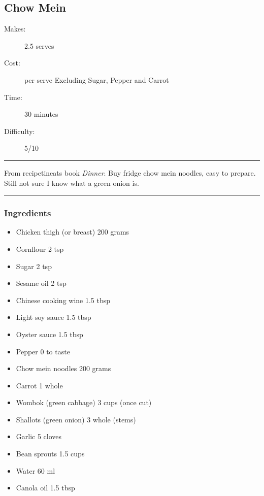 \documentclass[]{article}
\begin{document}
\subsection*{\center\huge Chow Mein}
\begin{description}
\item[Makes:] 2.5 serves
\item[Cost:]  per serve Excluding Sugar, Pepper and Carrot
\item[Time:] 30 minutes
\item[Difficulty:] 5/10
\end{description}
\vspace{0.2cm}\hrule\vspace{0.5cm}
\begin{adjustwidth}{0.5 cm}{0.5 cm}

From recipetineats book \textit{Dinner}. Buy fridge chow mein noodles, easy to prepare. Still not sure I know what a green onion is. \hfill{}\color{black}

\end{adjustwidth}
\vspace{0.5cm}\hrule
\subsubsection*{\Large Ingredients}
\begin{multicols}{2}
\begin{itemize}
 \item Chicken thigh (or breast) \hfill 200 grams
 \item Cornflour \hfill 2 tsp
 \item Sugar \hfill 2 tsp
 \item Sesame oil \hfill 2 tsp
 \item Chinese cooking wine \hfill 1.5 tbsp
 \item Light soy sauce \hfill 1.5 tbsp
 \item Oyster sauce \hfill 1.5 tbsp
 \item Pepper \hfill 0 to taste
 \item Chow mein noodles \hfill 200 grams
 \item Carrot \hfill 1 whole
 \item Wombok (green cabbage) \hfill 3 cups (once cut)
 \item Shallots (green onion) \hfill 3 whole (stems)
 \item Garlic \hfill 5 cloves
 \item Bean sprouts \hfill 1.5 cups
 \item Water \hfill 60 ml
 \item Canola oil \hfill 1.5 tbsp
\end{itemize}
\end{multicols}
\end{document}
